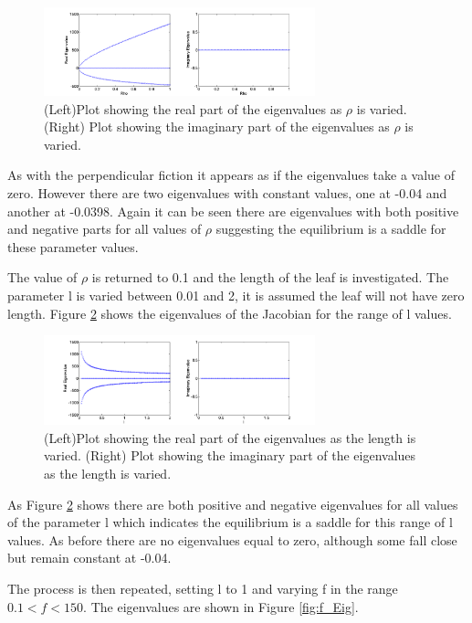 \begin{figure}[H]
\centering
\includegraphics[width=0.7\textwidth]{Rho_Eigenvalues.png}
\caption{\label{fig:Rho_Eig}(Left)Plot showing the real part of the eigenvalues as $\rho$ is varied. (Right) Plot showing the imaginary part of the eigenvalues as $\rho$ is varied.
}
\end{figure}
As with the perpendicular fiction it appears as if the eigenvalues take a value of zero. However there are two eigenvalues with constant values, one at -0.04 and another at -0.0398. Again it can be seen there are eigenvalues with both positive and negative parts for all values of $\rho$ suggesting the equilibrium is a saddle for these parameter values. 

The value of $\rho$ is returned to 0.1 and the length of the leaf is investigated. The parameter l is varied between 0.01 and 2, it is assumed the leaf will not have zero length. Figure \ref{fig:l_Eig} shows the eigenvalues of the Jacobian for the range of l values.

\begin{figure}[H]
\centering
\includegraphics[width=0.7\textwidth]{l_Eigenvalues.png}
\caption{\label{fig:l_Eig}(Left)Plot showing the real part of the eigenvalues as the length is varied. (Right) Plot showing the imaginary part of the eigenvalues as the length is varied.
}
\end{figure}

As Figure \ref{fig:l_Eig} shows there are both positive and negative eigenvalues for all values of the parameter l which indicates the equilibrium is a saddle for this range of l values. As before there are no eigenvalues equal to zero, although some fall close but remain constant at -0.04.

The process is then repeated, setting l to 1 and varying f in the range $0.1<f<150$. The eigenvalues are shown in Figure \ref{fig:f_Eig}. 

